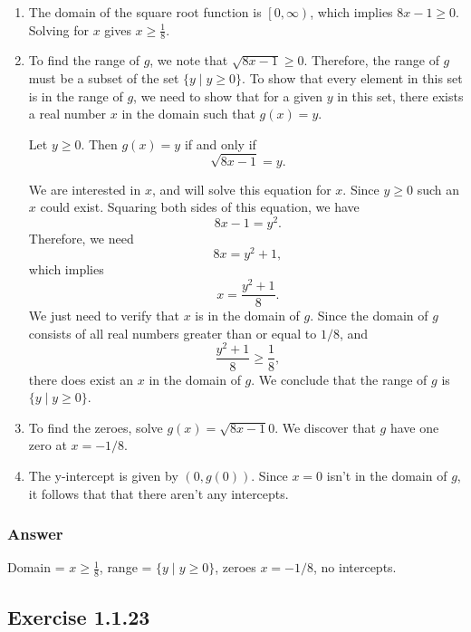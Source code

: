 \documentclass[11pt, letterpaper, oneside]{memoir}
\begin{document}
\begin{enumerate}[label=\roman*]

  \item
    The domain of the square root function is $ \left[ 0, \infty \right) $, which implies $ 8x - 1 \ge 0 $. Solving for $ x $ gives $ x \ge \frac{1}{8} $.

  \item
    To find the range of $ g $, we note that $ \sqrt{8x - 1} \ge 0 $. Therefore, the range of $ g $ must be a subset of the set $ \{y \mid y \ge 0\} $. To show that every element in this set is in the range of $ g $, we need to show that for a given $ y $ in this set, there exists a real number $ x $ in the domain such that $ g(x) = y $.

    Let $ y \ge 0 $. Then $ g(x) = y $ if and only if
    $$ \phantom{.}
    \sqrt{8x - 1} = y
    .$$

    We are interested in $ x $, and will solve this equation for $ x $. Since $ y \ge 0 $ such an $ x $ could exist. Squaring both sides of this equation, we have
    $$ \phantom{.}
    {8x - 1} = y^2
    .$$
    Therefore, we need
    $$ \phantom{.}
    8x = y^2 + 1
    ,$$
    which implies
    $$ \phantom{.}
    x = \frac{y^2 + 1}{8}
    .$$
    We just need to verify that $ x $ is in the domain of $ g $. Since the domain of $ g $ consists of all real numbers greater than or equal to $ 1 / 8 $, and
    $$ \phantom{.}
    \frac{y^2 + 1}{8} \ge \frac{1}{8}
    ,$$
    there does exist an $ x $ in the domain of $ g $. We conclude that the range of $ g $ is $ \{ y \mid y \ge 0 \} $.

  \item
    To find the zeroes, solve $ g(x) = \sqrt{8x - 1}0 $. We discover that $ g $ have one zero at $ x = -1/8 $.

  \item The y-intercept is given by $ (0, g(0)) $. Since $ x = 0 $ isn't in the domain of $ g $, it follows that that there aren't any intercepts.

\end{enumerate}

\subsubsection{Answer}

Domain = $ x \ge \frac{1}{8} $, range = $ \{ y \mid y \ge 0 \} $, zeroes $ x = -1/8 $, no intercepts.

\subsection*{Exercise 1.1.23}
\end{document}

